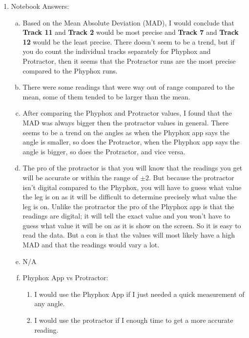 \documentclass[idxtotoc,hyperref,openany]{labbook} %
\begin{document}
\begin{enumerate}
    \item Notebook Answers:
    \begin{enumerate}[(a)]
        \item Based on the Mean Absolute Deviation (MAD), I would conclude that \textbf{Track 11} and \textbf{Track 2} would be most precise and \textbf{Track 7} and \textbf{Track 12} would be the least precise. There doesn't seem to be a trend, but if you do count the individual tracks separately for Phyphox and Protractor, then it seems that the Protractor runs are the most precise compared to the Phyphox runs.
        \item There were some readings that were way out of range compared to the mean, some of them tended to be larger than the mean.
        \item After comparing the Phyphox and Protractor values, I found that the MAD was always bigger then the protractor values in general. There seems to be a trend on the angles as when the Phyphox app says the angle is smaller, so does the Protractor, when the Phyphox app says the angle is bigger, so does the Protractor, and vice versa.
        \item The pro of the protractor is that you will know that the readings you get will be accurate or within the range of $\pm2$. But because the protractor isn't digital compared to the Phyphox, you will have to guess what value the leg is on as it will be difficult to determine precisely what value the leg is on. Unlike the protractor the pro of the Phyphox app is that the readings are digital; it will tell the exact value and you won't have to guess what value it will be on as it is show on the screen. So it is easy to read the data. But a con is that the values will most likely have a high MAD and that the readings would vary a lot.
        \item N/A
        \item Phyphox App vs Protractor:
        \begin{enumerate}[i]
            \item I would use the Phyphox App if I just needed a quick measurement of any angle.
            \item I would use the protractor if I enough time to get a more accurate reading.
        \end{enumerate}
    \end{enumerate}
\end{enumerate}
\end{document}

